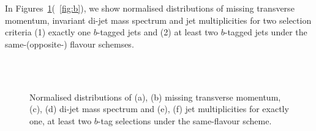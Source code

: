 \documentclass[a4paper]{jpconf}
\begin{document}
In Figures~\ref{fig:a}(~\ref{fig:b}), we show normalised distributions of missing transverse momentum, invariant di-jet mass spectrum and
jet multiplicities for two selection criteria (1) exactly one $b$-tagged jets and (2) at least two $b$-tagged jets under the same-(opposite-) flavour schemses. 
\begin{figure}[!htbp]
	\centering
	 \\
	 \\
	\caption{Normalised distributions of (a), (b) missing transverse momentum, (c), (d) di-jet mass spectrum and (e), (f) jet multiplicities 
	for exactly one, at least two $b$-tag selections under the same-flavour scheme.}
	\label{fig:a}
\end{figure}
\end{document}

